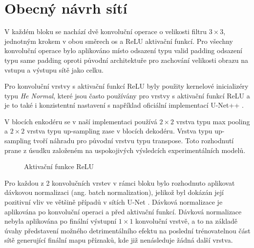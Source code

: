 \section{Obecný návrh sítí}
\label{sec:Chapter42}
V každém bloku se nachází dvě konvoluční operace o velikosti filtru $3\times3$, jednotným krokem v obou směrech os a ReLU aktivační funkcí. Pro všechny konvoluční operace bylo aplikováno místo odsazení typu valid padding odsazení typu same padding oproti původní architektuře \cite{unet} pro zachování velikosti obrazu na vstupu a výstupu sítě jako celku.

Pro konvoluční vrstvy s aktivační funkcí ReLU byly použity kernelové inicializéry typu \textit{He Normal}, které jsou často používány pro vrstvy s aktivační funkcí ReLU \cite{relu_henormal} a je to také i konzistentní nastavení s například oficiální implementací U-Net++ \cite{unetpp_github}. 

V blocích enkodéru se v naší implementaci používá $2\times2$ vrstva typu max pooling a $2\times2$ vrstva typu up-sampling zase v blocích dekodéru. Vrstva typu up-sampling tvoří náhradu pro původní vrstvu typu transpose. Toto rozhodnutí prane z úsudku založeném na uspokojivých výsledcích experimentálních modelů. 

\begin{figure}[ht]
    \centering
    \caption[Aktivační funkce ReLU]{Aktivační funkce ReLU}
    \label{fig:relu}
\end{figure}

Pro každou z 2 konvolučních vrstev v rámci bloku bylo rozhodnuto aplikovat dávkovou normalizaci (ang. batch normalization), jelikož byl dokázán její pozitivní vliv ve většině případů v sítích U-Net \cite{unetnormalization}. Dávková normalizace je aplikována po konvoluční operaci a před aktivační funkcí. Dávková normalizace nebyla aplikována po finální výstupní $1\times1$ konvoluční vrstvě, a to na základě úvahy představení možného detrimentálního efektu na poslední trénovatelnou část sítě generující finální mapu příznaků, kde již nenásleduje žádná další vrstva.


